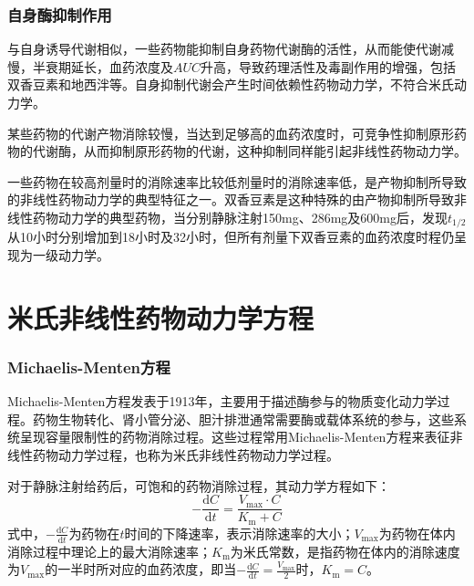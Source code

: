 \documentclass[dvipsnames, svgnames, x11names]{beamer}
\begin{document}
\begin{frame}
    \frametitle{自身酶抑制作用}
    与自身诱导代谢相似，一些药物能抑制自身药物代谢酶的活性，从而能使代谢减慢，半衰期延长，血药浓度及$AUC$升高，导致药理活性及毒副作用的增强，包括双香豆素和地西泮等。自身抑制代谢会产生时间依赖性药物动力学，不符合米氏动力学。

    某些药物的代谢产物消除较慢，当达到足够高的血药浓度时，可竞争性抑制原形药物的代谢酶，从而抑制原形药物的代谢，这种抑制同样能引起非线性药物动力学。
    \begin{blankblock}{}
        一些药物在较高剂量时的消除速率比较低剂量时的消除速率低，是产物抑制所导致的非线性药物动力学的典型特征之一。双香豆素是这种特殊的由产物抑制所导致非线性药物动力学的典型药物，当分别静脉注射150mg、286mg及600mg后，发现$t_{1/2}$从10小时分别增加到18小时及32小时，但所有剂量下双香豆素的血药浓度时程仍呈现为一级动力学。
    \end{blankblock}
\end{frame}


\section{米氏非线性药物动力学方程}


\begin{frame}
    \frametitle{Michaelis-Menten方程}
    Michaelis-Menten方程发表于1913年，主要用于描述酶参与的物质变化动力学过程。药物生物转化、肾小管分泌、胆汁排泄通常需要酶或载体系统的参与，这些系统呈现容量限制性的药物消除过程。这些过程常用Michaelis-Menten方程来表征非线性药物动力学过程，也称为米氏非线性药物动力学过程。

    对于静脉注射给药后，可饱和的药物消除过程，其动力学方程如下：
    \[
        -\frac{\mathrm{d}C}{\mathrm{d}t}=\frac{V_{\mathrm{max}}\cdot C}{K_{\mathrm{m}}+C}
    \]
    式中，$-\frac{\mathrm{d}C}{\mathrm{d}t}$为药物在$t$时间的下降速率，表示消除速率的大小；$V_{\mathrm{max}}$为药物在体内消除过程中理论上的最大消除速率；$K_{\mathrm{m}}$为米氏常数，是指药物在体内的消除速度为$V_{\mathrm{max}}$的一半时所对应的血药浓度，即当$-\frac{\mathrm{d}C}{\mathrm{d}t}=\frac{V_{\mathrm{max}}}{2}$时，$K_{\mathrm{m}}=C$。
\end{frame}
\end{document}
